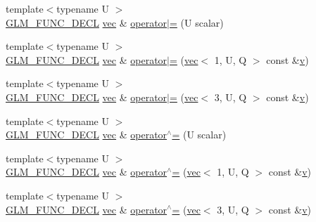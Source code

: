 \begin{DoxyCompactItemize}
\item 
{\footnotesize template$<$typename U $>$ }\\\mbox{\hyperlink{setup_8hpp_ab2d052de21a70539923e9bcbf6e83a51}{G\+L\+M\+\_\+\+F\+U\+N\+C\+\_\+\+D\+E\+CL}} \mbox{\hyperlink{structglm_1_1vec}{vec}} \& \mbox{\hyperlink{structglm_1_1vec_3_013_00_01_t_00_01_q_01_4_a0e29cf6b424eea7861eabc0314b5503a}{operator$\vert$=}} (U scalar)
\item 
{\footnotesize template$<$typename U $>$ }\\\mbox{\hyperlink{setup_8hpp_ab2d052de21a70539923e9bcbf6e83a51}{G\+L\+M\+\_\+\+F\+U\+N\+C\+\_\+\+D\+E\+CL}} \mbox{\hyperlink{structglm_1_1vec}{vec}} \& \mbox{\hyperlink{structglm_1_1vec_3_013_00_01_t_00_01_q_01_4_af0bea30bfc8f2f2b752cb089670fc904}{operator$\vert$=}} (\mbox{\hyperlink{structglm_1_1vec}{vec}}$<$ 1, U, Q $>$ const \&\mbox{\hyperlink{_s_d_l__opengl_8h_a10a82eabcb59d2fcd74acee063775f90}{v}})
\item 
{\footnotesize template$<$typename U $>$ }\\\mbox{\hyperlink{setup_8hpp_ab2d052de21a70539923e9bcbf6e83a51}{G\+L\+M\+\_\+\+F\+U\+N\+C\+\_\+\+D\+E\+CL}} \mbox{\hyperlink{structglm_1_1vec}{vec}} \& \mbox{\hyperlink{structglm_1_1vec_3_013_00_01_t_00_01_q_01_4_a90a93293245e58f807968ae29f1c633a}{operator$\vert$=}} (\mbox{\hyperlink{structglm_1_1vec}{vec}}$<$ 3, U, Q $>$ const \&\mbox{\hyperlink{_s_d_l__opengl_8h_a10a82eabcb59d2fcd74acee063775f90}{v}})
\item 
{\footnotesize template$<$typename U $>$ }\\\mbox{\hyperlink{setup_8hpp_ab2d052de21a70539923e9bcbf6e83a51}{G\+L\+M\+\_\+\+F\+U\+N\+C\+\_\+\+D\+E\+CL}} \mbox{\hyperlink{structglm_1_1vec}{vec}} \& \mbox{\hyperlink{structglm_1_1vec_3_013_00_01_t_00_01_q_01_4_a697cfaf1caf704ec84ecee6a5677b2c8}{operator$^\wedge$=}} (U scalar)
\item 
{\footnotesize template$<$typename U $>$ }\\\mbox{\hyperlink{setup_8hpp_ab2d052de21a70539923e9bcbf6e83a51}{G\+L\+M\+\_\+\+F\+U\+N\+C\+\_\+\+D\+E\+CL}} \mbox{\hyperlink{structglm_1_1vec}{vec}} \& \mbox{\hyperlink{structglm_1_1vec_3_013_00_01_t_00_01_q_01_4_a9499879dc0557fa6b4ad14cd6a1372b9}{operator$^\wedge$=}} (\mbox{\hyperlink{structglm_1_1vec}{vec}}$<$ 1, U, Q $>$ const \&\mbox{\hyperlink{_s_d_l__opengl_8h_a10a82eabcb59d2fcd74acee063775f90}{v}})
\item 
{\footnotesize template$<$typename U $>$ }\\\mbox{\hyperlink{setup_8hpp_ab2d052de21a70539923e9bcbf6e83a51}{G\+L\+M\+\_\+\+F\+U\+N\+C\+\_\+\+D\+E\+CL}} \mbox{\hyperlink{structglm_1_1vec}{vec}} \& \mbox{\hyperlink{structglm_1_1vec_3_013_00_01_t_00_01_q_01_4_a8dd8004cf0cab42517c2cb6cb7f18461}{operator$^\wedge$=}} (\mbox{\hyperlink{structglm_1_1vec}{vec}}$<$ 3, U, Q $>$ const \&\mbox{\hyperlink{_s_d_l__opengl_8h_a10a82eabcb59d2fcd74acee063775f90}{v}})

\end{DoxyCompactItemize}
